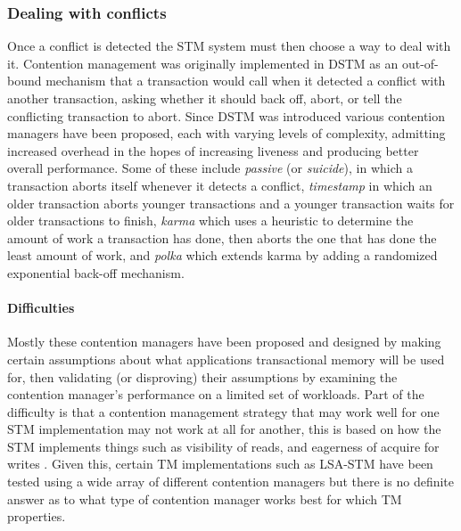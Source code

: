\subsubsection{Dealing with conflicts}
Once a conflict is detected the STM system must then choose a way to deal with it.
Contention management was originally implemented in DSTM \cite{HLMS03} as an out-of-bound mechanism
that a transaction would call when it detected a conflict with another transaction, 
asking whether it should back off, abort, or tell the conflicting transaction to abort.
Since DSTM was introduced various contention managers have been proposed, each with varying 
levels of complexity, admitting increased overhead in the hopes of increasing liveness and producing better overall performance.
Some of these include \emph{passive} (or \emph{suicide}), in which a transaction aborts itself
 whenever it detects a conflict, \emph{timestamp} in which an older transaction aborts younger
 transactions and a younger transaction waits for older transactions to finish, \emph{karma} which
 uses a heuristic to determine the amount of work a transaction has done, then aborts the one that
 has done the least amount of work, and \emph{polka} which extends karma by adding a randomized exponential back-off mechanism.

\paragraph{Difficulties}
Mostly these contention managers have been proposed and designed by making certain assumptions about
 what applications transactional memory will be used for, then validating (or disproving) their assumptions
by examining the contention manager's performance on a limited set of workloads.
Part of the difficulty is that a contention management strategy that may work well for one STM 
implementation may not work at all for another, this is based on how the STM implements things such as
 visibility of reads, and eagerness of acquire for writes \cite{DGK09}.
Given this, certain TM implementations such as LSA-STM have been tested using a wide array of 
different contention managers \cite{RFF07} but there is no definite answer as 
to what type of contention manager works best for which TM properties.

